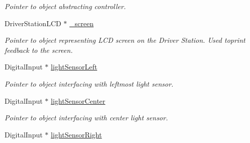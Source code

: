 \begin{DoxyCompactItemize}
\begin{DoxyCompactList}\small\item\em Pointer to object abstracting controller. \item\end{DoxyCompactList}\item 
\hypertarget{class_r_j_f_r_c2011_1_1_autonomous_a7661f30a1cf9f7086d3ab8581488f048}{
DriverStationLCD $\ast$ \hyperlink{class_r_j_f_r_c2011_1_1_autonomous_a7661f30a1cf9f7086d3ab8581488f048}{\_\-screen}}
\label{class_r_j_f_r_c2011_1_1_autonomous_a7661f30a1cf9f7086d3ab8581488f048}

\begin{DoxyCompactList}\small\item\em Pointer to object representing LCD screen on the Driver Station. Used toprint feedback to the screen. \item\end{DoxyCompactList}\item 
\hypertarget{class_r_j_f_r_c2011_1_1_autonomous_a891c7ae8a0250a58e96c4ef0dfb74352}{
DigitalInput $\ast$ \hyperlink{class_r_j_f_r_c2011_1_1_autonomous_a891c7ae8a0250a58e96c4ef0dfb74352}{lightSensorLeft}}
\label{class_r_j_f_r_c2011_1_1_autonomous_a891c7ae8a0250a58e96c4ef0dfb74352}

\begin{DoxyCompactList}\small\item\em Pointer to object interfacing with leftmost light sensor. \item\end{DoxyCompactList}\item 
\hypertarget{class_r_j_f_r_c2011_1_1_autonomous_a4c3907fd78cb30d997bf7b12eaad6fc5}{
DigitalInput $\ast$ \hyperlink{class_r_j_f_r_c2011_1_1_autonomous_a4c3907fd78cb30d997bf7b12eaad6fc5}{lightSensorCenter}}
\label{class_r_j_f_r_c2011_1_1_autonomous_a4c3907fd78cb30d997bf7b12eaad6fc5}

\begin{DoxyCompactList}\small\item\em Pointer to object interfacing with center light sensor. \item\end{DoxyCompactList}\item 
\hypertarget{class_r_j_f_r_c2011_1_1_autonomous_a9b8464d0ba37a956d44f769c80da212f}{
DigitalInput $\ast$ \hyperlink{class_r_j_f_r_c2011_1_1_autonomous_a9b8464d0ba37a956d44f769c80da212f}{lightSensorRight}}
\label{class_r_j_f_r_c2011_1_1_autonomous_a9b8464d0ba37a956d44f769c80da212f}


\end{DoxyCompactItemize}
